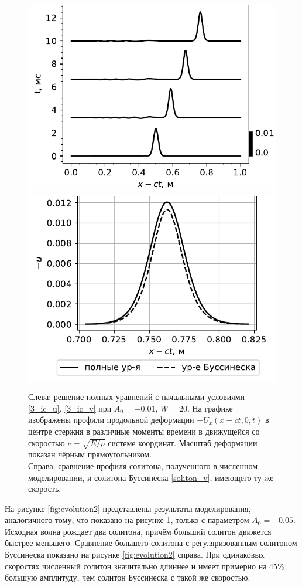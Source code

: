 \documentclass[12pt, a4paper]{report}
\begin{document}
\begin{figure}[h!]
	\centering
	\includegraphics[width=0.48\linewidth]{Figures/SolEvolSmall}
	\includegraphics[width=0.48\linewidth]{Figures/SolCompareSmall}
	\caption{Слева: решение полных уравнений с начальными условиями \eqref{3_ic_u}, \eqref{3_ic_v} при $A_0=-0.01$, $W=20$. На графике изображены профили продольной деформации $-U_x(x - ct, 0, t)$ в центре стержня в различные моменты времени в движущейся со скоростью $c=\sqrt{E/\rho}$ системе координат. Масштаб деформации показан чёрным прямоугольником. 
	\\
	Справа: сравнение профиля солитона, полученного в численном моделировании, и солитона Буссинеска \eqref{soliton_v}, имеющего ту же скорость.}
	\label{fig:evolution1}
\end{figure}

На рисунке \ref{fig:evolution2} представлены результаты моделирования, аналогичного тому, что показано на рисунке \ref{fig:evolution1}, только с параметром $A_0=-0.05$. Исходная волна рождает два солитона, причём больший солитон движется быстрее меньшего. Сравнение большего солитона с регуляризованным солитоном Буссинеска показано на рисунке \ref{fig:evolution2} справа. При одинаковых скоростях численный солитон значительно длиннее и имеет примерно на 45\% большую амплитуду, чем солитон Буссинеска с такой же скоростью.
\end{document}
